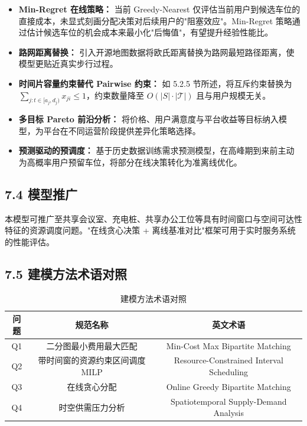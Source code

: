 \documentclass{ctexart}
\begin{document}
\begin{itemize}
  \item \textbf{Min-Regret 在线策略：} 当前 Greedy-Nearest 仅评估当前用户到候选车位的直接成本，未显式刻画分配决策对后续用户的"阻塞效应"。Min-Regret 策略通过估计候选车位的机会成本来最小化"后悔值"，有望提升经验性能比。
  \item \textbf{路网距离替换：} 引入开源地图数据将欧氏距离替换为路网最短路径距离，使模型更贴近真实步行过程。
  \item \textbf{时间片容量约束替代 Pairwise 约束：} 如 5.2.5 节所述，将互斥约束替换为 $\sum_{j: t\in[a_j,d_j)} x_{ji} \leq 1$，约束数量降至 $O(|S|\cdot|\mathcal{T}|)$ 且与用户规模无关。
  \item \textbf{多目标 Pareto 前沿分析：} 将价格、用户满意度与平台收益等目标纳入模型，为平台在不同运营阶段提供差异化策略选择。
  \item \textbf{预测驱动的预调度：} 基于历史数据训练需求预测模型，在高峰期到来前主动为高概率用户预留车位，将部分在线决策转化为准离线优化。
\end{itemize}

\subsection*{7.4 模型推广}

本模型可推广至共享会议室、充电桩、共享办公工位等具有时间窗口与空间可达性特征的资源调度问题。"在线贪心决策 + 离线基准对比"框架可用于实时服务系统的性能评估。

\subsection*{7.5 建模方法术语对照}

\begin{table}[H]
  \centering
  \caption{建模方法术语对照}
  \label{tab:terminology}
  \begin{tabular}{ccc}
    \toprule
    问题 & 规范名称               & 英文术语                                     \\
    \midrule
    Q1 & 二分图最小费用最大匹配        & Min-Cost Max Bipartite Matching          \\
    Q2 & 带时间窗的资源约束区间调度 MILP & Resource-Constrained Interval Scheduling \\
    Q3 & 在线贪心分配             & Online Greedy Bipartite Matching         \\
    Q4 & 时空供需压力分析           & Spatiotemporal Supply-Demand Analysis    \\
    \bottomrule
  \end{tabular}
\end{table}
\end{document}
